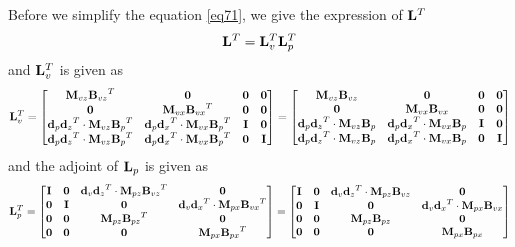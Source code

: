 \documentclass[revised,endfloat]{geophysics}
\begin{document}
Before we simplify the equation \ref{eq71}, we give the expression of ${\bf L}^T$
\begin{equation}
{\bf L}^T = {\bf L}_v^T   {\bf L}_p^T 
\label{eq72}
\end{equation}
and ${\bf L}_v^T$ is given as 
\begin{equation}
{\bf L}_v^T =
\begin{bmatrix}
{{\bf M}_{vz}{\bf B}_{vz}}^T & {\bf 0} &  {\bf 0}  & {\bf 0}    \\
{\bf 0} & {{\bf M}_{vx}{\bf B}_{vx}}^T    & {\bf 0} & {\bf 0}   \\
{{\bf d}_p{\bf d}_z}^T \cdot {{\bf M}_{vz}{\bf B}_{p}}^T & {{\bf d}_p{\bf d}_x}^T \cdot {{\bf M}_{vx}{\bf B}_{p}}^T & {\bf I} & {\bf 0} \\
{{\bf d}_p{\bf d}_z}^T \cdot {{\bf M}_{vz}{\bf B}_{p}}^T & {{\bf d}_p{\bf d}_x}^T \cdot {{\bf M}_{vx}{\bf B}_{p}}^T & {\bf 0} & {\bf I} \\
\end{bmatrix}  =
\begin{bmatrix}
{{\bf M}_{vz}{\bf B}_{vz}} & {\bf 0} &  {\bf 0}  & {\bf 0}    \\
{\bf 0} & {{\bf M}_{vx}{\bf B}_{vx}}    & {\bf 0} & {\bf 0}   \\
{{\bf d}_p{\bf d}_z}^T \cdot {{\bf M}_{vz}{\bf B}_{p}} & {{\bf d}_p{\bf d}_x}^T \cdot {{\bf M}_{vx}{\bf B}_{p}} & {\bf I} & {\bf 0} \\
{{\bf d}_p{\bf d}_z}^T \cdot {{\bf M}_{vz}{\bf B}_{p}} & {{\bf d}_p{\bf d}_x}^T \cdot {{\bf M}_{vx}{\bf B}_{p}} & {\bf 0} & {\bf I} \\
\end{bmatrix}
\label{eq73}
\end{equation}
and the adjoint of ${\bf L}_p$ is given as
\begin{equation}
{\bf L}_p^T =
\begin{bmatrix}
{\bf I} & {\bf 0} &  {{\bf d}_v{\bf d}_z}^T \cdot {{\bf M}_{pz}{\bf B}_{vz}}^T   & {\bf 0}    \\
{\bf 0} & {\bf I}  & {\bf 0} &  {{\bf d}_v{\bf d}_x}^T \cdot {{\bf M}_{px}{\bf B}_{vx}}^T   \\
{\bf 0} & {\bf 0} &  {{\bf M}_{pz}{\bf B}_{pz}}^T   & {\bf 0}  \\
{\bf 0} & {\bf 0} &  {\bf 0} & {{\bf M}_{px}{\bf B}_{px}}^T    \\
\end{bmatrix}
=
\begin{bmatrix}
{\bf I} & {\bf 0} &  {{\bf d}_v{\bf d}_z}^T \cdot {{\bf M}_{pz}{\bf B}_{vz}}   & {\bf 0}    \\
{\bf 0} & {\bf I}  & {\bf 0} &  {{\bf d}_v{\bf d}_x}^T \cdot {{\bf M}_{px}{\bf B}_{vx}}   \\
{\bf 0} & {\bf 0} &  {{\bf M}_{pz}{\bf B}_{pz}}   & {\bf 0}  \\
{\bf 0} & {\bf 0} &  {\bf 0} & {{\bf M}_{px}{\bf B}_{px}}    \\
\end{bmatrix}
\label{eq74}
\end{equation}
\end{document}
